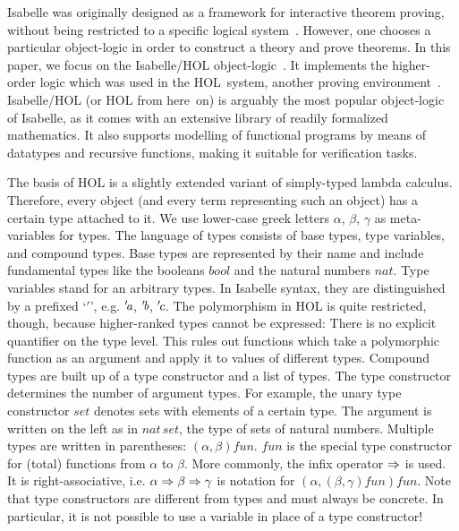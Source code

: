 Isabelle was originally designed as a framework for interactive theorem
proving, without being restricted to a specific logical system~\cite{paulson90}.
However, one chooses a particular object-logic in order to construct a theory
and prove theorems.
In this paper, we focus on the Isabelle/HOL object-logic~\cite{npw02}.
It implements the higher-order logic which was used in the HOL~system,
another proving environment~\cite{gordon93}.
Isabelle/HOL (or HOL from here~on) is arguably the most popular object-logic
of Isabelle, as it comes with an extensive library of readily formalized
mathematics.
It also supports modelling of functional programs by means of datatypes and
recursive functions, making it suitable for verification tasks. %

The basis of HOL is a slightly extended variant of simply-typed lambda calculus.
Therefore, every object (and every term representing such an object) has a
certain type attached to it.
We use lower-case greek letters $\alpha$, $\beta$, $\gamma$ as meta-variables
for types.
The language of types consists of base types, type variables, and compound
types.
Base types are represented by their name and include fundamental types like
the booleans $\mathit{bool}$ and the natural numbers $\mathit{nat}$.
Type variables stand for an arbitrary types.
In Isabelle syntax, they are distinguished by a prefixed `$'$', e.g.
${'\!\textit{a}}$, ${'\!\textit{b}}$, ${'\!\textit{c}}$.
The polymorphism in HOL is quite restricted, though, because higher-ranked
types cannot be expressed:
There is no explicit quantifier on the type level.
This rules out functions which take a polymorphic function as an argument and
apply it to values of different types.
Compound types are built up of a type constructor and a list of types.
The type constructor determines the number of argument types.
For example, the unary type constructor $\mathit{set}$ denotes sets with
elements of a certain type.
The argument is written on the left as in $\mathit{nat\,set}$, the type of
sets of natural numbers.
Multiple types are written in parentheses: $(\alpha, \beta) \mathit{fun}$.
$\mathit{fun}$ is the special type constructor for (total) functions from
$\alpha$ to $\beta$.
More commonly, the infix operator $\Rightarrow$ is used.
It is right-associative, i.e. $\alpha \Rightarrow \beta \Rightarrow \gamma$ is notation for
$(\alpha, (\beta, \gamma) \mathit{fun}) \mathit{fun}$.
Note that type constructors are different from types and must always be
concrete.
In particular, it is not possible to use a variable in place of a type
constructor!

